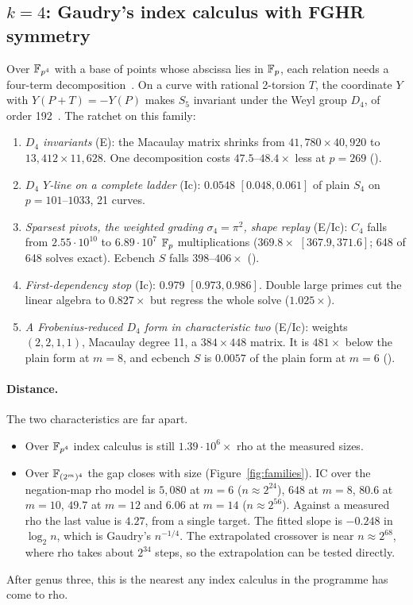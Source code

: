 \subsection{$k=4$: Gaudry's index calculus with FGHR symmetry}

Over $\mathbb{F}_{p^4}$ with a base of points whose abscissa lies in $\mathbb{F}_p$, each
relation needs a four-term decomposition~\cite{gaudry2009}. On a curve with
rational 2-torsion $T$, the coordinate $Y$ with $Y(P+T)=-Y(P)$ makes $S_5$
invariant under the Weyl group $D_4$, of order 192~\cite{fghr2014}. The
ratchet on this family:
\begin{enumerate}
\item \emph{$D_4$ invariants} (E): the Macaulay matrix shrinks from
  $41{,}780\times40{,}920$ to $13{,}412\times11{,}628$. One decomposition
  costs $47.5$--$48.4\times$ less at $p=269$
  ().
\item \emph{$D_4$ $Y$-line on a complete ladder} (Ic): $0.0548$
  $[0.048,0.061]$ of plain $S_4$ on $p=101$--$1033$, 21 curves.
\item \emph{Sparsest pivots, the weighted grading $\sigma_4=\pi^2$, shape
  replay} (E/Ic): $C_4$ falls from $2.55\cdot10^{10}$ to $6.89\cdot10^7$
  $\mathbb{F}_p$ multiplications ($369.8\times$ $[367.9,371.6]$; 648 of 648 solves
  exact). Ecbench $S$ falls $398$--$406\times$
  ().
\item \emph{First-dependency stop} (Ic): $0.979$ $[0.973,0.986]$. Double
  large primes cut the linear algebra to $0.827\times$ but regress the
  whole solve ($1.025\times$).
\item \emph{A Frobenius-reduced $D_4$ form in characteristic two} (E/Ic):
  weights $(2,2,1,1)$, Macaulay degree 11, a $384\times448$ matrix. It is
  $481\times$ below the plain form at $m=8$, and ecbench $S$ is $0.0057$ of
  the plain form at $m=6$ ().
\end{enumerate}

\paragraph{Distance.} The two characteristics are far apart.
\begin{itemize}
\item Over $\mathbb{F}_{p^4}$ index calculus is still $1.39\cdot10^6\times$ rho at
  the measured sizes.
\item Over $\mathbb{F}_{(2^m)^4}$ the gap closes with size
  (Figure~\ref{fig:families}). IC over the negation-map rho model is
  $5{,}080$ at $m=6$ ($n\approx2^{24}$), $648$ at $m=8$, $80.6$ at $m=10$,
  $49.7$ at $m=12$ and $6.06$ at $m=14$ ($n\approx2^{56}$). Against a
  measured rho the last value is $4.27$, from a single target. The fitted
  slope is $-0.248$ in $\log_2 n$, which is Gaudry's $n^{-1/4}$. The
  extrapolated crossover is near $n\approx2^{68}$, where rho takes about
  $2^{34}$ steps, so the extrapolation can be tested directly.
\end{itemize}
After genus three, this is the nearest any index calculus in the programme
has come to rho.


